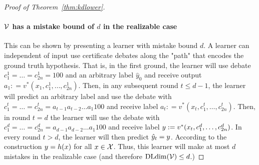 \documentclass[11pt,letterpaper]{article}
\theoremstyle{definition}
\theoremstyle{plain}
\begin{document}
\begin{proof}[Proof of Theorem~\ref{thm:kdlower}]
    \paragraph{${\mathcal V}$ has a mistake bound of $d$ in the realizable case} This can be shown by presenting a learner with mistake bound $d$. A learner can independent of input use certificate debates along the "path" that encodes the ground truth hypothesis. That is, in the first ground, the learner will use debate $c_1^1 = \dots = c_{2n}^1 = {100}$ and an arbitrary label $\hat{y}_0$ and receive output $a_1 : = v^* (x_1, c_1^1, \dots, c_{2n}^1)$. Then, in any subsequent round $t \leq d-1$, the learner will predict an arbitrary label and use the debate with $c_{1}^t = \dots = c_{2n}^t  = {a_{t-1} a_{t-2} \dots a_1 1 0 0}$ and receive label $a_{t} : = v^*(x_t,c_1^t, \dots, c_{2n}^t )$. 
 Then, in round $t = d $ the learner will use the debate with $c_{1}^d = \dots = c_{2n}^d  = {a_{d-1} a_{d-2} \dots a_1 1 0 0}$ and receive label $y : = v^*(x_t,c_1^d, \dots, c_{2n}^d )$.
 In every round $t > d$, the learner will then predict $\hat{y}_t= y$. According to the construction $y = h(x)$ for all $x\in {\mathcal X}$. Thus, this learner will make at most $d$ mistakes in the realizable case (and therefore  $\mathrm{DLdim}({\mathcal V}) \leq d$.)
\newcommand{\fat}{\textrm{fat}}

\end{proof}
\end{document}
